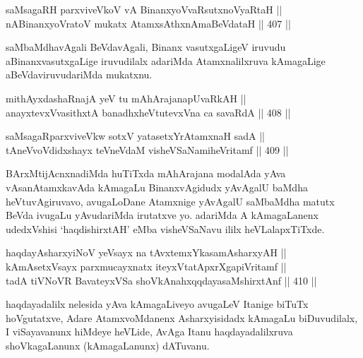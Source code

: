\begin{shl}
saMsagaRH parxviveVkoV vA BinanxyoVvaRsutxnoVyaRtaH || \\
nABinanxyoVratoV mukatx AtamxsAthxnAmaBeVdataH \hfill || 407 ||  
\end{shl}

\begin{artha}
saMbaMdhavAgali BeVdavAgali, Binanx vasutxgaLigeV iruvudu
aBinanxvasutxgaLige iruvudilalx adariMda Atamxnalilxruva kAmagaLige
aBeVdaviruvudariMda mukatxnu.
\end{artha}


\begin{shl}
mithAyxdashaRnajA yeV tu mAhArajanapUvaRkAH || \\
anayxtevxV\s vasithxtA banadhxheVtutevxVna ca savaRdA \hfill || 408 ||  
\end{shl}

\begin{shl}
saMsagaRparxviveVkw sotxV yatasetxYrAtamxnaH sadA || \\
tAneVvoVdidxshayx teVneVdaM visheVSaNamiheVritamf \hfill || 409 ||  
\end{shl}

\begin{artha}
BArxMtijAcnxnadiMda huTiTxda mAhArajana modalAda yAva vAsanAtamxkavAda
kAmagaLu BinanxvAgidudx yAvAgalU baMdha heVtuvAgiruvavo, avugaLoDane
Atamxnige yAvAgalU saMbaMdha matutx BeVda ivugaLu yAvudariMda
irutatxve yo. adariMda  A kAmagaLanenx udedxVshisi `haqdishirxtAH'
eMba visheVSaNavu ililx heVLalapxTiTxde.
\end{artha}

\begin{shl}
haqdayAsharxyiNoV yeV\s sayx na tAvxtemxYkasamAsharxyAH || \\
kAmAsetxV\s sayx parxmucayxnatx iteyxVtatApxrXgapiVritamf || \\
tadA tiVNoVR BavateyxVSa shoVkAnahxqqdayasaMshirxtAnf \hfill || 410 ||  
\end{shl}

\begin{artha}
haqdayadalilx nelesida yAva kAmagaLiveyo avugaLeV Itanige biTuTx
hoVgutatxve, Adare AtamxvoMdanenx Asharxyisidadx kAmagaLu
biDuvudilalx, I viSayavanunx hiMdeye heVLide, AvAga Itanu
haqdayadalilxruva shoVkagaLanunx (kAmagaLanunx) dATuvanu.
\end{artha}


